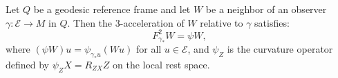 Let $Q$ be a geodesic reference frame and let $W$ be a neighbor of an observer $\gamma: \mathcal{E} \rightarrow M$ in $Q$. Then the 3-acceleration of $W$ relative to $\gamma$ satisfies:
$$F_{\gamma_*}^2 W = \psi W,$$
where $(\psi W)u = \psi_{\gamma_* u}(W u)$ for all $u \in \mathcal{E}$, and $\psi_Z$ is the curvature operator defined by $\psi_Z X = R_{ZX}Z$ on the local rest space.
